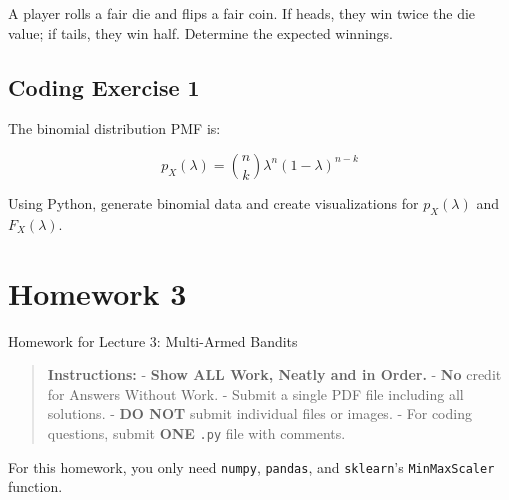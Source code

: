\documentclass[
  letterpaper,
  DIV=11,
  numbers=noendperiod]{scrreprt}
\makeatletter
\newcommand*\pandocbounded[1]{%
  \sbox\pandoc@box{#1}%
  \Gscale@div\@tempa{\textheight}{\dimexpr\ht\pandoc@box+\dp\pandoc@box\relax}%
  \Gscale@div\@tempb{\linewidth}{\wd\pandoc@box}%
  \ifdim\@tempb\p@<\@tempa\p@\let\@tempa\@tempb\fi%
  \ifdim\@tempa\p@<\p@\scalebox{\@tempa}{\usebox\pandoc@box}%
  \else\usebox{\pandoc@box}%
  \fi%
}
\makeatother
\begin{document}
A player rolls a fair die and flips a fair coin. If heads, they win
twice the die value; if tails, they win half. Determine the expected
winnings.

\section{Coding Exercise 1}\label{coding-exercise-1}

The binomial distribution PMF is:

\[
p_X(\lambda) = {n \choose k} \lambda^n (1-\lambda)^{n-k}
\]

Using Python, generate binomial data and create visualizations for
\(p_X(\lambda)\) and \(F_X(\lambda)\).

\section{\texorpdfstring{\href{https://colab.research.google.com/drive/1aA2D9X1oTxvi1BPl5TqSZ_2rKDOUIIHD?usp=sharing}{\protect\pandocbounded{}}}{}}\label{section}

\chapter{Homework 3}\label{homework-3}

\begin{tcolorbox}[enhanced jigsaw, colback=white, left=2mm, breakable, opacityback=0, bottomrule=.15mm, rightrule=.15mm, arc=.35mm, colframe=quarto-callout-note-color-frame, leftrule=.75mm, toprule=.15mm]

Homework for Lecture 3: Multi-Armed Bandits 📝

\end{tcolorbox}

\begin{quote}
\textbf{Instructions:} - \textbf{Show ALL Work, Neatly and in Order.} -
\textbf{No} credit for Answers Without Work. - Submit a single PDF file
including all solutions. - \textbf{DO NOT} submit individual files or
images. - For coding questions, submit \textbf{ONE} \texttt{.py} file
with comments.
\end{quote}

\begin{tcolorbox}[enhanced jigsaw, opacityback=0, left=2mm, breakable, bottomtitle=1mm, rightrule=.15mm, colframe=quarto-callout-note-color-frame, titlerule=0mm, colback=white, opacitybacktitle=0.6, toptitle=1mm, title=\textcolor{quarto-callout-note-color}{\faInfo}\hspace{0.5em}{Note}, colbacktitle=quarto-callout-note-color!10!white, bottomrule=.15mm, arc=.35mm, coltitle=black, leftrule=.75mm, toprule=.15mm]

For this homework, you only need \texttt{numpy}, \texttt{pandas}, and
\texttt{sklearn}'s \texttt{MinMaxScaler} function.

\end{tcolorbox}
\end{document}
